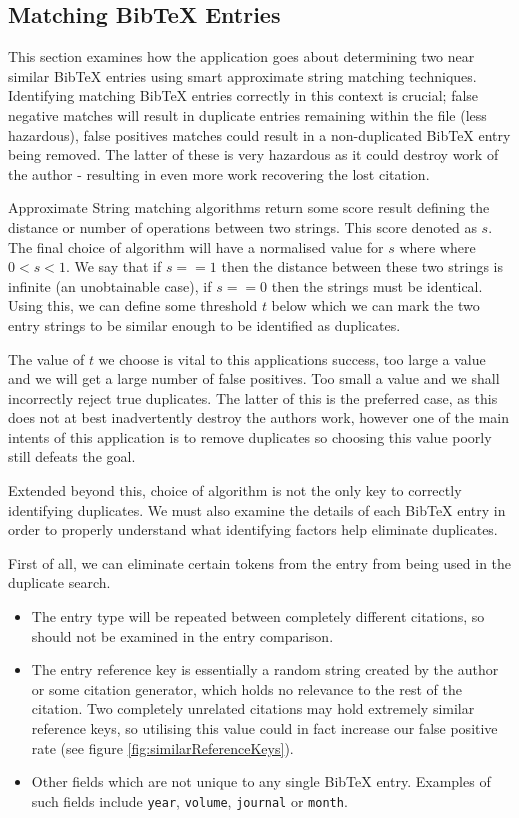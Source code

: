 \documentclass[a4paper,11pt]{article}
\newcommand{\code}[1]{\colorbox{codegray}{\texttt{#1}}}
\begin{document}
\subsection{Matching BibTeX Entries}
This section examines how the application goes about determining two near similar BibTeX entries using smart approximate string matching techniques. Identifying matching BibTeX entries correctly in this context is crucial; false negative matches will result in duplicate entries remaining within the file (less hazardous), false positives matches could result in a non-duplicated BibTeX entry being removed. The latter of these is very hazardous as it could destroy work of the author - resulting in even more work recovering the lost citation.

Approximate String matching algorithms return some score result defining the distance or number of operations between two strings. This score denoted as $s$. The final choice of algorithm will have a normalised value for $s$ where where $0 < s < 1$. We say that if $s == 1$ then the distance between these two strings is infinite (an unobtainable case), if $s == 0$ then the strings must be identical. Using this, we can define some threshold $t$ below which we can mark the two entry strings to be similar enough to be identified as duplicates.

The value of $t$ we choose is vital to this applications success, too large a value and we will get a large number of false positives. Too small a value and we shall incorrectly reject true duplicates. The latter of this is the preferred case, as this does not at best inadvertently destroy the authors work, however one of the main intents of this application is to remove duplicates so choosing this value poorly still defeats the goal.

Extended beyond this, choice of algorithm is not the only key to correctly identifying duplicates. We must also examine the details of each BibTeX entry in order to properly understand what identifying factors help eliminate duplicates.

First of all, we can eliminate certain tokens from the entry from being used in the duplicate search.
\begin{itemize}
    \item The entry type will be repeated between completely different citations, so should not be examined in the entry comparison.
    \item The entry reference key is essentially a random string created by the author or some citation generator, which holds no relevance to the rest of the citation. Two completely unrelated citations may hold extremely similar reference keys, so utilising this value could in fact increase our false positive rate (see figure \ref{fig:similarReferenceKeys}).
    \item Other fields which are not unique to any single BibTeX entry. Examples of such fields include \code{year}, \code{volume}, \code{journal} or \code{month}.
\end{itemize}
\end{document}
